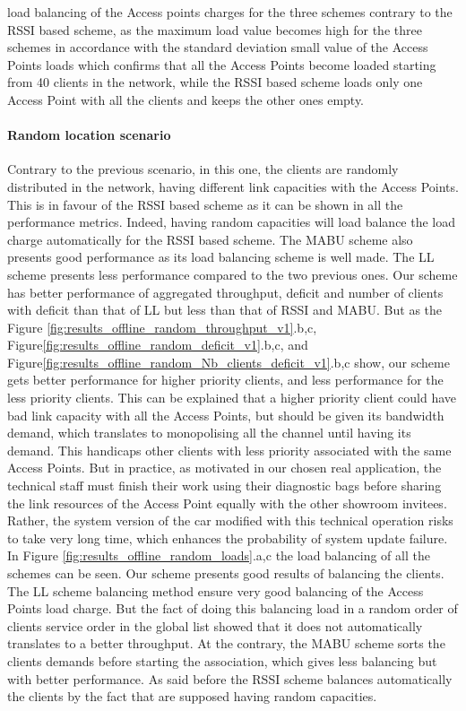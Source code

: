 \documentclass[journal,transmag]{IEEEtran}
\begin{document}
load balancing of the Access points charges for the three schemes contrary to the RSSI based scheme, as the maximum load value becomes high for the three schemes in accordance with the standard deviation small value of the Access Points loads which confirms that all the Access Points become loaded starting from 40 clients in the network, while the RSSI based scheme loads only one Access Point with all the clients and keeps the other ones empty.   
   
\paragraph{Random location scenario}
Contrary to the previous scenario, in this one, the clients are randomly distributed in the network, having different link capacities with the Access Points. This is in favour of the RSSI based scheme as it can be shown in all the performance metrics. Indeed, having random capacities will load balance the load charge automatically for the RSSI based scheme. The MABU scheme also presents good performance as its load balancing scheme is well made. The LL scheme presents less performance compared to the two previous ones. Our scheme has better performance of aggregated throughput, deficit and number of clients with deficit than that of LL but less than that of RSSI and MABU. But as the Figure \ref{fig:results_offline_random_throughput_v1}.b,c, Figure\ref{fig:results_offline_random_deficit_v1}.b,c, and Figure\ref{fig:results_offline_random_Nb_clients_deficit_v1}.b,c show, our scheme gets better performance for higher priority clients, and less performance for the less priority clients. This can be explained that a higher priority client could have bad link capacity with all the Access Points, but should be given its bandwidth demand, which translates to monopolising all the channel until having its demand. This handicaps other clients with less priority associated with the same Access Points. But in practice, as motivated in our chosen real application, the technical staff must finish their work using their diagnostic bags before sharing the link resources of the Access Point equally with the other showroom invitees. Rather, the system version of the car modified with this technical operation risks to take very long time, which enhances the probability of system update failure. In Figure \ref{fig:results_offline_random_loads}.a,c the load balancing of all the schemes can be seen. Our scheme presents good results of balancing the clients. The LL scheme balancing method ensure very good balancing of the Access Points load charge. But the fact of doing this balancing load in a random order of clients service order in the global list showed that it does not automatically translates to a better throughput. At the contrary, the MABU scheme sorts the clients demands before starting the association, which gives less balancing but with better performance. As said before the RSSI scheme balances automatically the clients by the fact that are supposed having random capacities.      
\end{document}

